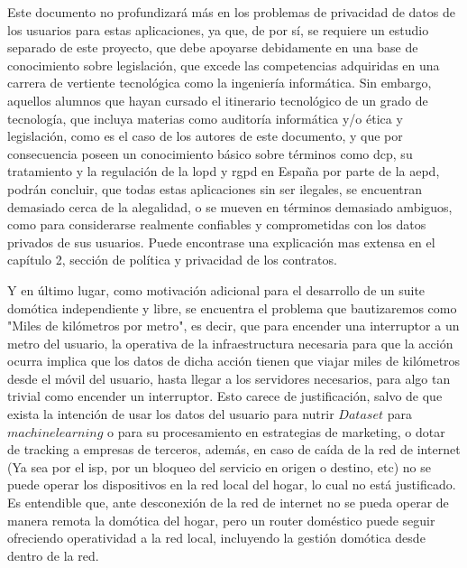 \vspace{1cm}

Este documento no profundizará más en los problemas de privacidad de datos de los usuarios para estas aplicaciones, ya que, de por sí, se requiere un estudio separado de este proyecto, que debe apoyarse debidamente en una base de conocimiento sobre legislación, que excede las competencias adquiridas en una carrera de vertiente tecnológica como la ingeniería informática. Sin embargo, aquellos alumnos que hayan cursado el itinerario tecnológico de un grado de tecnología, que incluya materias como auditoría informática y/o ética y legislación, como es el caso de los autores de este documento, y que por consecuencia poseen un conocimiento básico sobre términos como \gls{dcp}, su tratamiento y la regulación de la \gls{lopd} y \gls{rgpd} en España por parte de la \gls{aepd}, podrán concluir, que todas estas aplicaciones sin ser ilegales, se encuentran demasiado cerca de la alegalidad, o se mueven en términos demasiado ambiguos, como para considerarse realmente confiables y comprometidas con los datos privados de sus usuarios. Puede encontrase una explicación mas extensa en el capítulo 2, sección de política y privacidad de los contratos.

\vspace{1cm}

Y en último lugar, como motivación adicional para el desarrollo de un suite domótica independiente y libre, se encuentra el problema que bautizaremos como "Miles de kilómetros por metro", es decir, que para encender una interruptor a un metro del usuario, la operativa de la infraestructura necesaria para que la acción ocurra implica que los datos de dicha acción tienen que viajar miles de kilómetros desde el móvil del usuario, hasta llegar a los servidores necesarios, para algo tan trivial como encender un interruptor. Esto carece de justificación, salvo de que exista la intención de usar los datos del usuario para nutrir $Dataset$ para $machine learning$ o para su procesamiento en estrategias de marketing, o dotar de tracking a empresas de terceros, además, en caso de caída de la red de internet (Ya sea por el \gls{isp}, por un bloqueo del servicio en origen o destino, etc) no se puede operar los dispositivos en la red local del hogar, lo cual no está justificado. Es entendible que, ante desconexión de la red de internet no se pueda operar de manera remota la domótica del hogar, pero un router doméstico puede seguir ofreciendo operatividad a la red local, incluyendo la gestión domótica desde dentro de la red.

